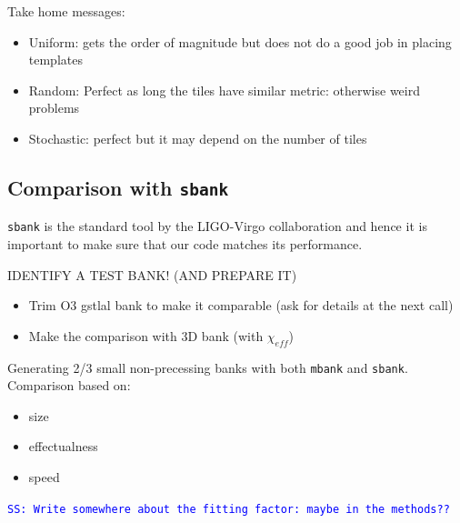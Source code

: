 \documentclass[twocolumn,showpacs,preprintnumbers,nofootinbib,prd,
superscriptaddress,10pt]{revtex4-1}
\newcommand{\stefano}[1]{{\textcolor{blue}{\texttt{SS: #1}} }}
\begin{document}
Take home messages:
\begin{itemize}
	\item Uniform: gets the order of magnitude but does not do a good job in placing templates
	\item Random: Perfect as long the tiles have similar metric: otherwise weird problems
	\item Stochastic: perfect but it may depend on the number of tiles
\end{itemize}



\subsection{Comparison with \texttt{sbank} }\label{sec:sbank_comparison}

\texttt{sbank} is the standard tool by the LIGO-Virgo collaboration and hence it is important to make sure that our code matches its performance.

IDENTIFY A TEST BANK! (AND PREPARE IT)
	\begin{itemize}
		\item Trim O3 gstlal bank to make it comparable (ask for details at the next call)
		\item Make the comparison with 3D bank (with $\chi_{eff}$)
	\end{itemize}



Generating 2/3 small non-precessing banks with both \texttt{mbank} and \texttt{sbank}.
Comparison based on:
	\begin{itemize}
		\item size
		\item effectualness
		\item speed
	\end{itemize}

\stefano{Write somewhere about the fitting factor: maybe in the methods??}
\end{document}

